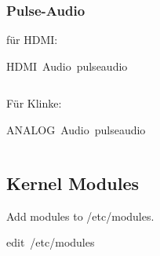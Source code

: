 \documentclass[11pt, a4paper,ngerman]{article}
\begin{document}
\subsubsection{Pulse-Audio}

für HDMI: \\

\begin{mintedbox}[breakable=true,
 bottomrule=0.5mm,
 width=\paperwidth-3cm,
 boxsep=1mm, 
 enhanced=true,
 colframe = monoblack,
 drop fuzzy shadow,
 colback = black
 ]{HDMI\ Audio\ pulseaudio}%
 

     \inputminted[firstline=3,lastline=3, 
     linenos=true, framesep=2mm, mathescape, numbersep=5pt,tabsize=4,%
]{bash}{includes/pulseaudio.sh}%

\end{mintedbox}%
\vspace{0.2cm}

Für Klinke: \\

\begin{mintedbox}[breakable=true,
 bottomrule=0.5mm,
 width=\paperwidth-3cm,
 boxsep=1mm, 
 enhanced=true,
 colframe = monoblack,
 drop fuzzy shadow,
 colback = black
 ]{ANALOG\ Audio\ pulseaudio}%
 

     \inputminted[firstline=5,lastline=5, 
     linenos=true, framesep=2mm, mathescape, numbersep=5pt,tabsize=4,%
]{bash}{includes/pulseaudio.sh}%

\end{mintedbox}%
\vspace{0.2cm}

\newpage %
\subsection{Kernel Modules}

Add modules to /etc/modules. \\

\begin{mintedbox}[breakable=true,
 bottomrule=0.5mm,
 width=\paperwidth-3cm,
 boxsep=1mm, 
 enhanced=true,
 colframe = monoblack,
 drop fuzzy shadow,
 colback = black
 ]{edit\ /etc/modules}%
 

     \inputminted[firstline=5,lastline=5, 
     linenos=true, framesep=2mm, mathescape, numbersep=5pt,tabsize=4,%
]{bash}{includes/modules.sh}%

\end{mintedbox}%
\end{document}
